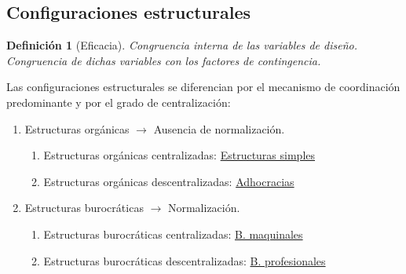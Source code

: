 \documentclass[12pt]{article}
\theoremstyle{definition_wo_parentheses}
\newtheorem{definicion}{Definición}[section]
\begin{document}
\subsection{Configuraciones estructurales}

\begin{definicion}[Eficacia]
Congruencia interna de las variables de diseño. Congruencia de dichas variables con los factores de contingencia.
\end{definicion}

Las configuraciones estructurales se diferencian por el mecanismo de coordinación predominante y por el grado de centralización:

\begin{enumerate}[I]
\item Estructuras orgánicas $\rightarrow$ Ausencia de normalización.
\begin{enumerate}[a]
\item Estructuras orgánicas centralizadas: \underline{Estructuras simples}
\item Estructuras orgánicas descentralizadas: \underline{Adhocracias}
\end{enumerate}
\item Estructuras burocráticas $\rightarrow$ Normalización.
\begin{enumerate}[a]
\item Estructuras burocráticas centralizadas: \underline{B. maquinales}
\item Estructuras burocráticas descentralizadas: \underline{B. profesionales}
\end{enumerate}
\end{enumerate}
\end{document}
